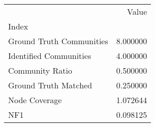 \begin{tabular}{lr}
\toprule
{} &     Value \\
Index                    &           \\
\midrule
Ground Truth Communities &  8.000000 \\
Identified Communities   &  4.000000 \\
Community Ratio          &  0.500000 \\
Ground Truth Matched     &  0.250000 \\
Node Coverage            &  1.072644 \\
NF1                      &  0.098125 \\
\bottomrule
\end{tabular}
